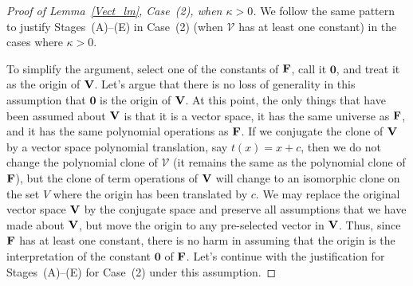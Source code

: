 \documentclass[12pt]{amsart}
\theoremstyle{definition}
\numberwithin{equation}{section}
\newcommand{\m}[1]{{\mathbf{\uppercase{#1}}}}
\begin{document}
\bigskip

\begin{proof}[Proof of Lemma~\ref{Vect_lm}, Case~(2), when $\kappa>0$]

We follow the same pattern to justify
Stages~(A)--(E) in Case~(2) (when $\mathcal{V}$ has at least one constant)
in the cases where $\kappa>0$.

To simplify the argument, select
one of the constants of $\m f$, call it $\mathbf{0}$,
and treat it as the origin of $\m v$.
Let's argue that there is no loss of generality in
this assumption 
that $\mathbf{0}$ is the origin of $\m v$.
At this point, the only things that have been
assumed about $\m v$ is that it is a vector space,
it has the same universe as $\m f$, and it has the same
polynomial operations as $\m f$.
If we conjugate the clone of $\m v$ by a
vector space polynomial translation, say $t(x)=x+c$,
then we do not change the polynomial clone of $\mathcal{V}$
(it remains the same as the polynomial clone of $\m f$),
but the clone of term operations of $\m v$
will change to an isomorphic clone on the set $V$
where the origin has been translated by $c$.
We may replace the original
vector space $\m v$ by the conjugate
space and preserve all assumptions that we have made about $\m v$,
but move the origin to any  pre-selected vector in $\m v$.
Thus, since $\m f$ has at least one constant,
there is no harm in assuming
that the origin is the interpretation of the
constant $\mathbf{0}$
of $\m f$. Let's continue with the
justification for Stages~(A)--(E) for Case~(2) under this assumption.


\end{proof}
\end{document}
